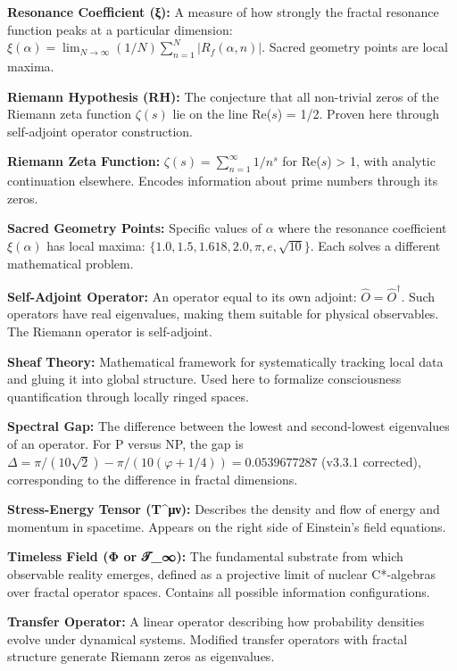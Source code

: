 \noindent\textbf{Resonance Coefficient (ξ):} A measure of how strongly the fractal resonance function peaks at a particular dimension: $\xi(\alpha) = \lim_{N \to \infty} (1/N)\sum_{n=1}^{N} |R_f(\alpha, n)|$. Sacred geometry points are local maxima.

\noindent\textbf{Riemann Hypothesis (RH):} The conjecture that all non-trivial zeros of the Riemann zeta function $\zeta(s)$ lie on the line Re($s$) = 1/2. Proven here through self-adjoint operator construction.

\noindent\textbf{Riemann Zeta Function:} $\zeta(s) = \sum_{n=1}^{\infty} 1/n^s$ for Re($s$) > 1, with analytic continuation elsewhere. Encodes information about prime numbers through its zeros.

\noindent\textbf{Sacred Geometry Points:} Specific values of $\alpha$ where the resonance coefficient $\xi(\alpha)$ has local maxima: $\{1.0, 1.5, 1.618, 2.0, \pi, e, \sqrt{10}\}$. Each solves a different mathematical problem.

\noindent\textbf{Self-Adjoint Operator:} An operator equal to its own adjoint: $\hat{O} = \hat{O}^\dagger$. Such operators have real eigenvalues, making them suitable for physical observables. The Riemann operator is self-adjoint.

\noindent\textbf{Sheaf Theory:} Mathematical framework for systematically tracking local data and gluing it into global structure. Used here to formalize consciousness quantification through locally ringed spaces.

\noindent\textbf{Spectral Gap:} The difference between the lowest and second-lowest eigenvalues of an operator. For P versus NP, the gap is $\Delta = \pi/(10\sqrt{2}) - \pi/(10(\varphi+1/4)) = 0.0539677287$ (v3.3.1 corrected), corresponding to the difference in fractal dimensions.

\noindent\textbf{Stress-Energy Tensor (T^μν):} Describes the density and flow of energy and momentum in spacetime. Appears on the right side of Einstein's field equations.

\noindent\textbf{Timeless Field (Φ or 𝒯_∞):} The fundamental substrate from which observable reality emerges, defined as a projective limit of nuclear C*-algebras over fractal operator spaces. Contains all possible information configurations.

\noindent\textbf{Transfer Operator:} A linear operator describing how probability densities evolve under dynamical systems. Modified transfer operators with fractal structure generate Riemann zeros as eigenvalues.


